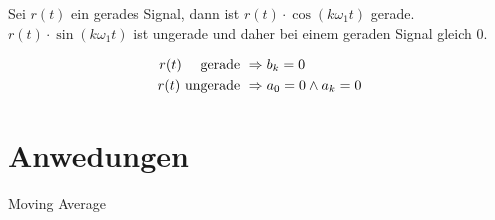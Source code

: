 Sei $r(t)$ ein gerades Signal, dann ist $r(t) \cdot \cos(k \omega_1 t)$ gerade. $r(t) \cdot \sin(k \omega_1 t)$ ist ungerade und daher bei einem geraden Signal gleich $0$.

\begin{align*}
r(t) \text{ \space\space\space gerade }   &\Rightarrow b_k = 0 \\
r(t) \text{ ungerade } &\Rightarrow a_0 = 0 \land a_k = 0
\end{align*}







\section{Anwedungen}

Moving Average


